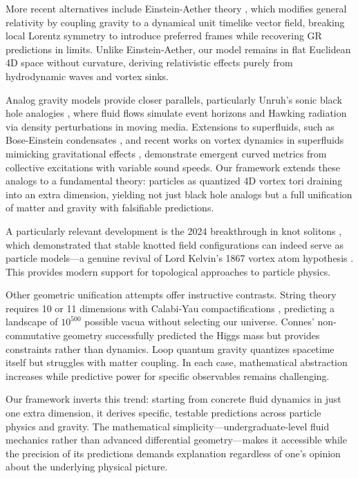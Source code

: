 More recent alternatives include Einstein-Aether theory \cite{jacobson2004einstein}, which modifies general relativity by coupling gravity to a dynamical unit timelike vector field, breaking local Lorentz symmetry to introduce preferred frames while recovering GR predictions in limits. Unlike Einstein-Aether, our model remains in flat Euclidean 4D space without curvature, deriving relativistic effects purely from hydrodynamic waves and vortex sinks.

Analog gravity models provide closer parallels, particularly Unruh's sonic black hole analogies \cite{unruh1981experimental}, where fluid flows simulate event horizons and Hawking radiation via density perturbations in moving media. Extensions to superfluids, such as Bose-Einstein condensates \cite{steinhauer2016hawking}, and recent works on vortex dynamics in superfluids mimicking gravitational effects \cite{svancara2024rotating}, demonstrate emergent curved metrics from collective excitations with variable sound speeds. Our framework extends these analogs to a fundamental theory: particles as quantized 4D vortex tori draining into an extra dimension, yielding not just black hole analogs but a full unification of matter and gravity with falsifiable predictions.

A particularly relevant development is the 2024 breakthrough in knot solitons \cite{eto2024knots}, which demonstrated that stable knotted field configurations can indeed serve as particle models---a genuine revival of Lord Kelvin's 1867 vortex atom hypothesis \cite{thomson1867vortex}. This provides modern support for topological approaches to particle physics.

Other geometric unification attempts offer instructive contrasts. String theory requires 10 or 11 dimensions with Calabi-Yau compactifications \cite{candelas1985vacuum}, predicting a landscape of $10^{500}$ possible vacua without selecting our universe. Connes' non-commutative geometry \cite{chamseddine2007gravity} successfully predicted the Higgs mass but provides constraints rather than dynamics. Loop quantum gravity \cite{ashtekar1986new} quantizes spacetime itself but struggles with matter coupling. In each case, mathematical abstraction increases while predictive power for specific observables remains challenging.

Our framework inverts this trend: starting from concrete fluid dynamics in just one extra dimension, it derives specific, testable predictions across particle physics and gravity. The mathematical simplicity---undergraduate-level fluid mechanics rather than advanced differential geometry---makes it accessible while the precision of its predictions demands explanation regardless of one's opinion about the underlying physical picture.
